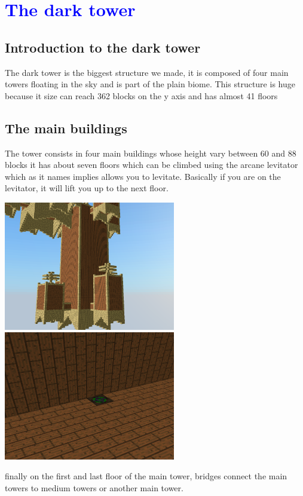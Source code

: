 \documentclass[article]{report}             %
\begin{document}
		\chapter{\textcolor{blue}{The dark tower}}
			\section{Introduction to the dark tower}
				The dark tower is the biggest structure we made, it is composed of four main towers floating in the sky and is part of the plain biome. This structure is huge because it size can reach 362 blocks on the y axis and has almost 41 floors


			\section{The main buildings}
				The tower consists in four main buildings whose height vary between 60 and 88 blocks it has about seven floors which can be climbed using the arcane levitator which as it names implies allows you to levitate. Basically if you are on the levitator, it will lift you up to the next floor.

				\begin{center}
					\includegraphics[width=7.5cm]{images/DT/Main.png}
					\includegraphics[width=7.5cm]{images/DT/floor.png}
				\end{center}
			finally on the first and last floor of the main tower, bridges connect the main towers to medium towers or another main tower.
\end{document}
